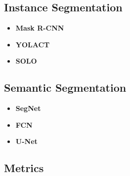 \documentclass[a4paper]{article}
\begin{document}
\subsection{Instance Segmentation}

\begin{itemize}
	\item \textbf{Mask R-CNN}
	\item \textbf{YOLACT}
	\item \textbf{SOLO}
\end{itemize}

\subsection{Semantic Segmentation}

\begin{itemize}
	\item \textbf{SegNet}
	\item \textbf{FCN}
	\item \textbf{U-Net}
\end{itemize}

\subsection{Metrics}




\end{document}

